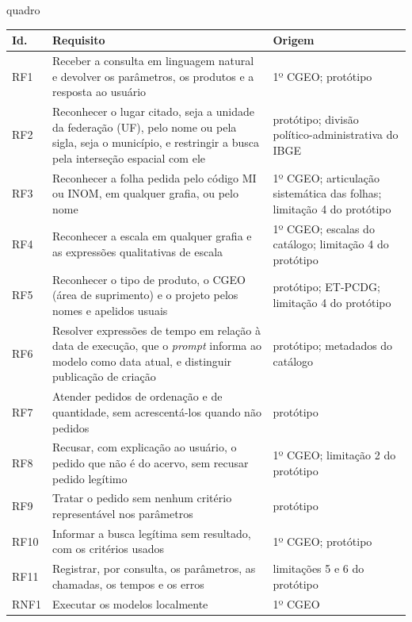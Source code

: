 \begin{fixo}{quadro}
\centering
\caption{Requisitos da solução e a sua origem}
\label{quadro:requisitos}
\footnotesize
\begin{tabular}{|>{\centering\arraybackslash}p{1.2cm}|>{\raggedright\arraybackslash}p{9.0cm}|>{\raggedright\arraybackslash}p{4.4cm}|}
\hline
\textbf{Id.} & \textbf{Requisito} & \textbf{Origem} \\ \hline
RF1 & Receber a consulta em linguagem natural e devolver os parâmetros, os produtos e a resposta ao usuário & 1º CGEO; protótipo \\ \hline
RF2 & Reconhecer o lugar citado, seja a unidade da federação (UF), pelo nome ou pela sigla, seja o município, e restringir a busca pela interseção espacial com ele & protótipo; divisão político-administrativa do IBGE \\ \hline
RF3 & Reconhecer a folha pedida pelo código MI ou INOM, em qualquer grafia, ou pelo nome & 1º CGEO; articulação sistemática das folhas; limitação 4 do protótipo \\ \hline
RF4 & Reconhecer a escala em qualquer grafia e as expressões qualitativas de escala & 1º CGEO; escalas do catálogo; limitação 4 do protótipo \\ \hline
RF5 & Reconhecer o tipo de produto, o CGEO (área de suprimento) e o projeto pelos nomes e apelidos usuais & protótipo; ET-PCDG; limitação 4 do protótipo \\ \hline
RF6 & Resolver expressões de tempo em relação à data de execução, que o \textit{prompt} informa ao modelo como data atual, e distinguir publicação de criação & protótipo; metadados do catálogo \\ \hline
RF7 & Atender pedidos de ordenação e de quantidade, sem acrescentá-los quando não pedidos & protótipo \\ \hline
RF8 & Recusar, com explicação ao usuário, o pedido que não é do acervo, sem recusar pedido legítimo & 1º CGEO; limitação 2 do protótipo \\ \hline
RF9 & Tratar o pedido sem nenhum critério representável nos parâmetros & protótipo \\ \hline
RF10 & Informar a busca legítima sem resultado, com os critérios usados & 1º CGEO; protótipo \\ \hline
RF11 & Registrar, por consulta, os parâmetros, as chamadas, os tempos e os erros & limitações 5 e 6 do protótipo \\ \hline
RNF1 & Executar os modelos localmente & 1º CGEO \\ \hline

\end{tabular}
\end{fixo}
